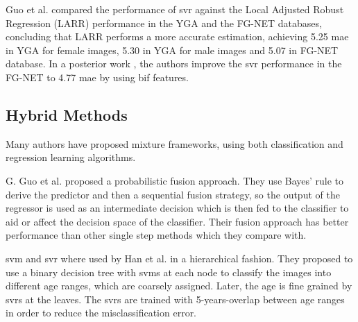 Guo et al. \cite{4544009} \cite{Guo:2008:IHA:2319085.2321608} compared the performance of \gls{svr} against the Local Adjusted Robust Regression (LARR) performance in the YGA and the FG-NET databases, concluding that LARR performs a more accurate estimation, achieving 5.25 \gls{mae} in YGA for female images, 5.30 in YGA for male images and  5.07 in FG-NET database. In a posterior work \cite{conf/cvpr/GuoMFH09}, the authors improve the \gls{svr} performance in the FG-NET to 4.77 \gls{mae} by using \gls{bif} features.

\subsection{Hybrid Methods}

Many authors have proposed mixture frameworks, using both classification and regression learning algorithms. 

G. Guo et al. \cite{4563041} proposed a probabilistic fusion approach. They use Bayes' rule to derive the predictor and then a sequential fusion strategy, so the output of the regressor is used as an intermediate decision which is then fed to the classifier to aid or affect the decision space of the classifier. Their fusion approach has better performance than other single step methods which they compare with.

\gls{svm} and \gls{svr} where used by Han et al. \cite{han:age} in a hierarchical fashion. They proposed to use a binary decision tree with \glspl{svm} at each node to classify the images into different age ranges, which are coarsely assigned. Later, the age is fine grained by \glspl{svr} at the leaves. The \glspl{svr} are trained with 5-years-overlap between age ranges in order to reduce the misclassification error.


